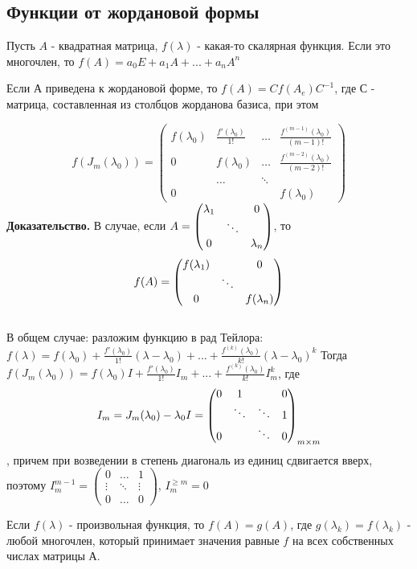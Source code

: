 \subsection{Функции от жордановой формы}
Пусть $A$ - квадратная матрица, $f(\lambda)$ - какая-то скалярная функция.
Если это многочлен, то $f(A)=a_0E+a_1A+...+a_nA^n$
\begin{theor}\label{jord_function}
Если А приведена к жордановой форме, то $f(A)=Cf(A_e)C^{-1}$, где С - матрица,
составленная из столбцов жорданова базиса, при этом
\end{theor}
$$f(J_m(\lambda_0))=\begin{pmatrix}f(\lambda_0)&\frac{f'(\lambda_0)}{1!}&\dots&
\frac{f^{(m-1)}(\lambda_0)}{(m-1)!}\\0&f(\lambda_0)&\dots&\frac{f^{(m-2)}
(\lambda_0)}{(m-2)!}\\&\dots&\ddots&\\0&&&f(\lambda_0)\end{pmatrix}$$
\textbf{Доказательство.} В случае, если $A=\begin{pmatrix}\lambda_1&&\large{0}
\\&\ddots&\\\large{0}&&\lambda_n\end{pmatrix}$, то $$f(A)=\begin{pmatrix}f
(\lambda_1)&&\large{0}\\&\ddots&\\\large{0}&&f(\lambda_n)\end{pmatrix}$$\\
В общем случае: разложим функцию в рад Тейлора: $f(\lambda)=f(\lambda_0)+\frac
{f'(\lambda_0)}{1!}(\lambda-\lambda_0)+...+\frac{f^{(k)}(\lambda_0)}{k!}
(\lambda-\lambda_0)^k$
Тогда $f(J_m(\lambda_0))=f(\lambda_0)I+\frac{f'(\lambda_0)}{1!}I_m+...+
		\frac{f^{(k)}(\lambda_0)}{k!}I_m^k$, где $$I_m=J_m(\lambda_0)-
		\lambda_0I=\begin{pmatrix}0&1&&\large{0}\\&\ddots&\ddots&1\\\large{0}
		&&\ddots&0\end{pmatrix}_{m\times m}$$, причем при возведении в степень
				диагональ из единиц сдвигается вверх, поэтому $I_m^{m-1}=
				\begin{pmatrix}0&\dots&1\\\vdots&\ddots&\vdots\\0&\dots&0\end{pmatrix}$,
				$I_m^{\geqslant m}=0$

Если $f(\lambda)$ - произвольная функция, то $f(A)=g(A)$, где $g(\lambda_k)=
f(\lambda_k)$ - любой многочлен, который принимает значения равные $f$ на всех
собственных числах матрицы А.

